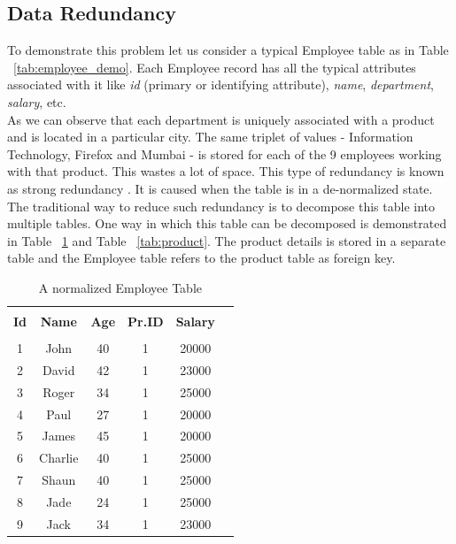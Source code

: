 \documentclass[12pt, oneside]{book}
\begin{document}
\subsection{Data Redundancy}
To demonstrate this problem let us consider a typical Employee table as in Table ~\ref{tab:employee_demo}. Each Employee record has all the typical attributes associated with it like \emph{id} (primary or identifying attribute), \emph{name}, \emph{department}, \emph{salary}, etc. \\
As we can observe that each department is uniquely associated with a product and is located in a particular city. The same triplet of values - Information Technology, Firefox and Mumbai - is stored for each of the 9 employees working with that product. This wastes a lot of space. This type of redundancy is known as strong redundancy \cite{redundancy}. It is caused when the table is in a de-normalized state. The traditional way to reduce such redundancy is to decompose this table into multiple tables. One way in which this table can be decomposed is demonstrated in Table ~\ref{tab:emp_normal} and Table ~\ref{tab:product}. The product details is stored in a separate table and the Employee table refers to the product table as foreign key.

\begin{table}
    \centering
    \begin{tabular}{| c | c | c | c | c | @{}m{0pt}@{}}
    \hline
    \multicolumn{1}{|c|}{} & \multicolumn{1}{c|}{} & \multicolumn{1}{c|}{} & \multicolumn{1}{c|}{} & \multicolumn{1}{c|}{} &  \\
    \multicolumn{1}{|c|}{\textbf{Id}} & \multicolumn{1}{c|}{\textbf{Name}} & \multicolumn{1}{c|}{\textbf{Age}} & \multicolumn{1}{c|}{\textbf{Pr.ID}} & \multicolumn{1}{c|}{\textbf{Salary}} & \\
    \multicolumn{1}{|c|}{} & \multicolumn{1}{c|}{} & \multicolumn{1}{c|}{} & \multicolumn{1}{c|}{} & \multicolumn{1}{c|}{} &  \\
    \hline
    1 & John & 40 & 1 & 20000 & \\ [1ex] \hline
    2 & David & 42 & 1 & 23000 & \\ [1ex] \hline
    3 & Roger & 34 & 1 & 25000 & \\ [1ex] \hline
    4 & Paul & 27 & 1 & 20000 & \\ [1ex] \hline
    5 & James & 45 & 1 & 20000 & \\ [1ex] \hline
    6 & Charlie & 40 & 1 & 25000 & \\ [1ex] \hline
    7 & Shaun & 40 & 1 & 25000 & \\ [1ex] \hline
    8 & Jade & 24 & 1 & 25000 & \\ [1ex] \hline
    9 & Jack & 34 & 1 & 23000 & \\ [1ex] \hline
    \end{tabular}
    \caption{A normalized Employee Table}
    \label{tab:emp_normal}
\end{table}
\end{document}
